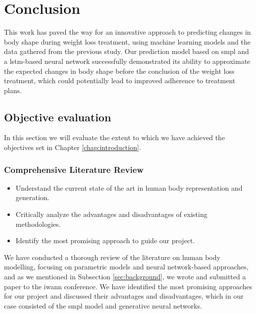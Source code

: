 
\chapter{Conclusion}\label{chap:conclusion}

This work has paved the way for an innovative approach to predicting changes in
body shape during weight loss treatment, using machine learning models and the
data gathered from the previous study. Our prediction model based on \gls{smpl}
and a \gls{lstm}-based neural network successfully demonstrated its ability to
approximate the expected changes in body shape before the conclusion of the
weight loss treatment, which could potentially lead to improved adherence to
treatment plans.

\section{Objective evaluation}

In this section we will evaluate the extent to which we have achieved the
objectives set in Chapter \ref{chap:introduction}.

\subsection{Comprehensive Literature Review}

\begin{itemize}
      \item Understand the current state of the art in human body representation and
            generation.

      \item Critically analyze the advantages and disadvantages of existing methodologies.
      \item Identify the most promising approach to guide our project.
\end{itemize}

We have conducted a thorough review of the literature on human body modelling,
focusing on parametric models and neural network-based approaches, and as we
mentioned in Subsection \ref{sec:background}, we wrote and submitted a paper to
the \gls{iwann} conference. We have identified the most promising approaches
for our project and discussed their advantages and disadvantages, which in our
case consisted of the \gls{smpl} model and generative neural networks.

